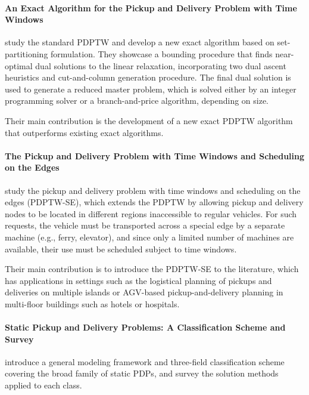 \documentclass[preprint,11pt,authoryear]{elsarticle}
\begin{document}
\paragraph{\textbf{An Exact Algorithm for the Pickup and Delivery Problem with Time Windows}}

\citet{baldacciExactAlgorithmPickup2011} study the standard PDPTW and develop a new exact algorithm based on set-partitioning formulation. 
They showcase a bounding procedure that finds near-optimal dual solutions to the linear relaxation, incorporating two dual ascent heuristics and cut-and-column 
generation procedure. The final dual solution is used to generate a reduced master problem, which is solved either by an integer programming solver or a branch-and-price algorithm, depending on size.

Their main contribution is the development of a new exact PDPTW algorithm that outperforms existing exact algorithms.

\paragraph{\textbf{The Pickup and Delivery Problem with Time Windows and Scheduling on the Edges}}

\citet{barbosaPickupDeliveryProblem2026} study the pickup and delivery problem with time windows
and scheduling on the edges (PDPTW-SE), which extends the PDPTW by allowing pickup and delivery
nodes to be located in different regions inaccessible to regular vehicles. 
For such requests, the vehicle must be transported across a special edge by a separate machine (e.g., ferry, elevator), and since only a limited number of machines are available, 
their use must be scheduled subject to time windows.

Their main contribution is to introduce the PDPTW-SE to the literature, which has applications
in settings such as the logistical planning of pickups and deliveries on multiple islands or AGV-based pickup-and-delivery planning in multi-floor buildings such as hotels or hospitals.


\paragraph{\textbf{Static Pickup and Delivery Problems: A Classification Scheme and Survey}}

\citet{berbegliaStaticPickupDelivery2007} introduce a general modeling framework and three-field classification scheme
covering the broad family of static PDPs, and survey the solution methods applied to each class.
\end{document}
